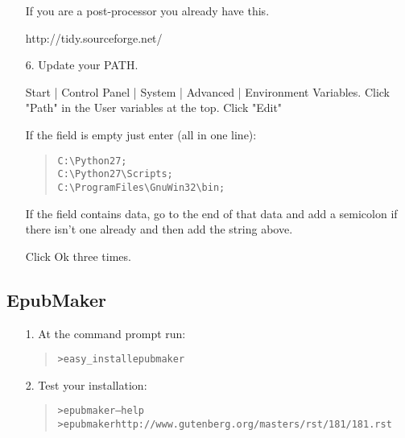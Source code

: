 \documentclass[a5paper]{book}
\begin{document}
\begin{german}
\begin{itemize}
If you are a post-processor you already have this.\par

{http://tidy.sourceforge.net/}\par

\item[6.] 
Update your PATH.\par

Start | Control Panel | System | Advanced | Environment Variables.
Click "Path" in the User variables at the top.
Click "Edit"\par

If the field is empty just enter (all in one line):\par

\begin{quote}
\begin{alltt}
C:\textbackslash{}Python27;
C:\textbackslash{}Python27\textbackslash{}Scripts;
C:\textbackslash{}Program Files\textbackslash{}GnuWin32\textbackslash{}bin;
\end{alltt}
\end{quote}

If the field contains data, go to the end of that data and add a
semicolon if there isn’t one already and then add the string above.\par

Click Ok three times.\par
\end{itemize}

%
\label{epubmaker}%
\hypertarget{epubmaker}{}%
%
\subsection*{EpubMaker}


\begin{itemize}
\item[1.] 
At the command prompt run:\par

\begin{quote}
\begin{alltt}
> easy\_install epubmaker
\end{alltt}
\end{quote}

\item[2.] 
Test your installation:\par

\begin{quote}
\begin{alltt}
> epubmaker --help
> epubmaker http://www.gutenberg.org/masters/rst/181/181.rst
\end{alltt}
\end{quote}
\end{itemize}


\end{german}
\end{document}
